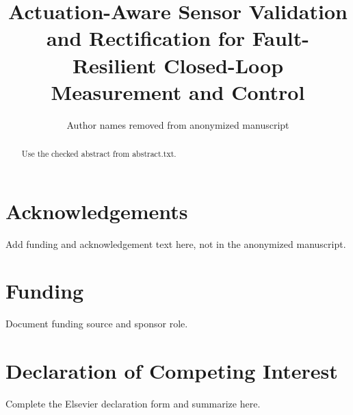 \documentclass[preprint,12pt]{elsarticle}
\begin{document}
\begin{frontmatter}

\title{Actuation-Aware Sensor Validation and Rectification for Fault-Resilient Closed-Loop Measurement and Control}

\author[1]{Author names removed from anonymized manuscript}
\address[1]{Affiliations to be provided on title page only}

\begin{abstract}
Use the checked abstract from abstract.txt.
\end{abstract}

\end{frontmatter}

\section*{Acknowledgements}
Add funding and acknowledgement text here, not in the anonymized manuscript.

\section*{Funding}
Document funding source and sponsor role.

\section*{Declaration of Competing Interest}
Complete the Elsevier declaration form and summarize here.
\end{document}

